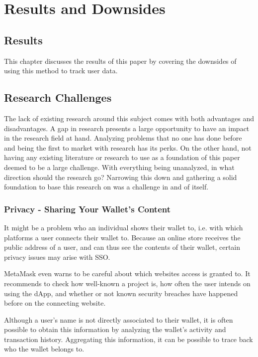 \chapter{Results and Downsides}
\label{ch:results}


%
%
\section{Results}
\label{sec:results:results}
This chapter discusses the results of this paper by covering the downsides of using this method to track user data.


%
%
\section{Research Challenges}
\label{sec:results:researchChallenges}
The lack of existing research around this subject comes with both advantages and disadvantages. A gap in research presents a large opportunity to have an impact in the research field at hand. Analyzing problems that no one has done before and being the first to market with research has its perks. On the other hand, not having any existing literature or research to use as a foundation of this paper deemed to be a large challenge. With everything being unanalyzed, in what direction should the research go? Narrowing this down and gathering a solid foundation to base this research on was a challenge in and of itself.


\subsection{Privacy - Sharing Your Wallet's Content}
\label{sec:results:walletContent}
It might be a problem who an individual shows their wallet to, i.e. with which platforms a user connects their wallet to. Because an online store receives the public address of a user, and can thus see the contents of their wallet, certain privacy issues may arise with SSO.

MetaMask even warns to be careful about which websites access is granted to. It recommends to check how well-known a project is, how often the user intends on using the dApp, and whether or not known security breaches have happened before on the connecting website. \cite{metaMask}

Although a user's name is not directly associated to their wallet, it is often possible to obtain this information by analyzing the wallet's activity and transaction history. Aggregating this information, it can be possible to trace back who the wallet belongs to.


